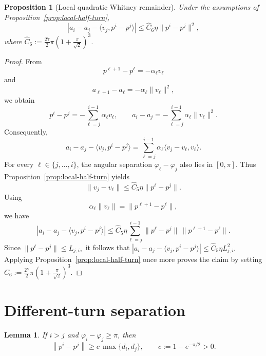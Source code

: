 \documentclass[11pt]{article}
\numberwithin{equation}{section}
\newtheorem{lemma}[theorem]{Lemma}
\newtheorem{proposition}[theorem]{Proposition}
\newcommand{\norm}[1]{\left\lVert #1\right\rVert}
\begin{document}
\begin{proposition}[Local quadratic Whitney remainder]
\label{prop:local-quadratic}
Under the assumptions of Proposition~\ref{prop:local-half-turn},
\[
\left|
a_i-a_j-\langle v_j,p^i-p^j\rangle
\right|
\le
\widehat C_6 \eta\|p^i-p^j\|^2,
\]
where $\widehat C_6:=\frac{27}{2}\pi\left(1+\frac{\pi}{\sqrt{2}}\right)^3$.
\end{proposition}

\begin{proof}
From
\[
p^{\ell+1}-p^\ell=-\alpha_\ell v_\ell
\]
and
\[
a_{\ell+1}-a_\ell=-\alpha_\ell\|v_\ell\|^2,
\]
we obtain
\[
p^i-p^j
=
-\sum_{\ell=j}^{i-1}\alpha_\ell v_\ell,
\qquad
a_i-a_j
=
-\sum_{\ell=j}^{i-1}\alpha_\ell\|v_\ell\|^2.
\]
Consequently,
\[
a_i-a_j-\langle v_j,p^i-p^j\rangle
=
\sum_{\ell=j}^{i-1}
\alpha_\ell
\langle v_j-v_\ell,v_\ell\rangle.
\]
For every $\ell\in\{j,\ldots,i\}$, the angular separation
$\varphi_\ell-\varphi_j$ also lies in $[0,\pi]$. Thus
Proposition~\ref{prop:local-half-turn} yields
\[
\|v_j-v_\ell\|
\le
\widehat C_5\eta\|p^\ell-p^j\|.
\]
Using
\[
\alpha_\ell\|v_\ell\|
=
\|p^{\ell+1}-p^\ell\|,
\]
we have
\[
\left|
a_i-a_j-\langle v_j,p^i-p^j\rangle
\right|
\le
\widehat C_5\eta
\sum_{\ell=j}^{i-1}
\|p^\ell-p^j\|
\,
\|p^{\ell+1}-p^\ell\|.
\]
Since
$
\|p^\ell-p^j\|
\le
L_{j,i},
$
it follows that
$
\left|
a_i-a_j-\langle v_j,p^i-p^j\rangle
\right|
\le
\widehat C_5\eta L_{j,i}^2.
$
Applying Proposition~\ref{prop:local-half-turn} once more proves the claim by setting $\widehat C_6:=\frac{27}{2}\pi\left(1+\frac{\pi}{\sqrt{2}}\right)^3$.
\end{proof}


\section{Different-turn separation}

\begin{lemma}
\label{lem:separation}
If \(i>j\) and \(\varphi_i-\varphi_j\geq\pi\), then
\[
    \norm{p^i-p^j}
    \geq c\,\max\{d_i,d_j\},
    \qquad
    c:=1-e^{-\pi/2}>0.
\]
\end{lemma}
\end{document}
